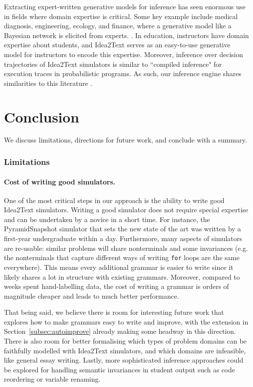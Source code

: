 Extracting expert-written generative models for inference has seen enormous use in fields where domain expertise is critical. Some key example include medical diagnosis, engineering, ecology, and finance, where a generative model like a Bayesian network is elicited from experts. \cite{expertconservation, expertengineering}. In education, instructors have domain expertise about students, and Idea2Text serves as an easy-to-use generative model for instructors to encode this expertise.
Moreover, inference over decision trajectories of Idea2Text simulators is similar to ``compiled inference" for execution traces in probabilistic programs. As such, our inference engine shares similarities to this literature \cite{ritchie2016DAIPP,le2016inference}. 


\section{Conclusion}

We discuss limitations, directions for future work, and conclude with a summary.

\subsubsection{Limitations}

\paragraph{Cost of writing good simulators.} One of the most critical steps in our approach is the ability to write good Idea2Text simulators. Writing a good simulator does not require special expertise and can be undertaken by a novice in a short time. For instance, the PyramidSnapshot simulator that sets the new state of the art  was written by a first-year undergraduate within a day. Furthermore, many aspects of simulators are re-usable: similar problems will share nonterminals and some invariances (e.g. the nonterminals that capture different ways of writing \texttt{for} loops are the same everywhere). This means every additional grammar is easier to write since it likely shares a lot in structure with existing grammars. Moreover, compared to weeks spent hand-labelling data, the cost of writing a grammar is orders of magnitude cheaper and leads to much better performance. 

That being said, we believe there is room for interesting future work that explores how to make grammars easy to write and improve, with the extension in Section~\ref{subsec:autoimprove} already making some headway in this direction. There is also room for better formalising which types of problem domains can be faithfully modelled with Idea2Text simulators, and which domains are infeasible, like general essay writing. Lastly, more sophisticated inference approaches could be explored for handling semantic invariances in student output such as code reordering or variable renaming.

